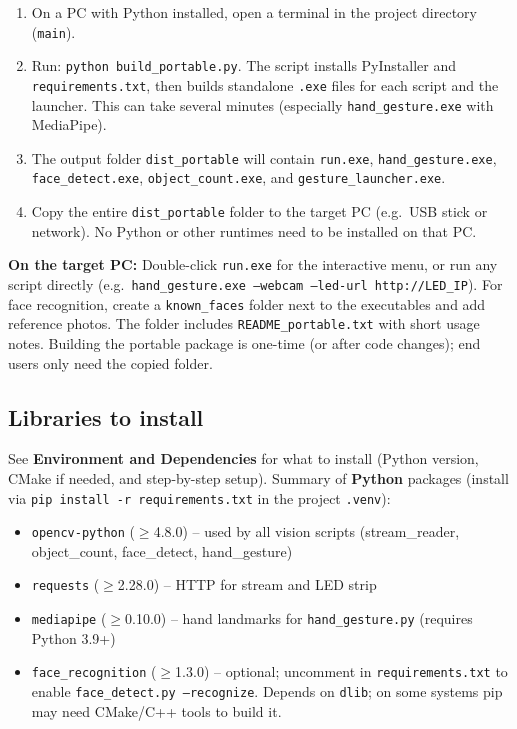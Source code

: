 \documentclass[a4paper,12pt]{article}
\begin{document}
\begin{enumerate}
    \item On a PC with Python installed, open a terminal in the project directory (\texttt{main}).
    \item Run: \texttt{python build\_portable.py}. The script installs PyInstaller and \texttt{requirements.txt}, then builds standalone \texttt{.exe} files for each script and the launcher. This can take several minutes (especially \texttt{hand\_gesture.exe} with MediaPipe).
    \item The output folder \texttt{dist\_portable} will contain \texttt{run.exe}, \texttt{hand\_gesture.exe}, \texttt{face\_detect.exe}, \texttt{object\_count.exe}, and \texttt{gesture\_launcher.exe}.
    \item Copy the entire \texttt{dist\_portable} folder to the target PC (e.g.\ USB stick or network). No Python or other runtimes need to be installed on that PC.
\end{enumerate}

\textbf{On the target PC:} Double-click \texttt{run.exe} for the interactive menu, or run any script directly (e.g.\ \texttt{hand\_gesture.exe --webcam --led-url http://LED\_IP}). For face recognition, create a \texttt{known\_faces} folder next to the executables and add reference photos. The folder includes \texttt{README\_portable.txt} with short usage notes. Building the portable package is one-time (or after code changes); end users only need the copied folder.

\subsection{Libraries to install}
See \textbf{Environment and Dependencies} for what to install (Python version, CMake if needed, and step-by-step setup). Summary of \textbf{Python} packages (install via \texttt{pip install -r requirements.txt} in the project \texttt{.venv}):
\begin{itemize}
    \item \texttt{opencv-python} ($\geq$4.8.0) -- used by all vision scripts (stream\_reader, object\_count, face\_detect, hand\_gesture)
    \item \texttt{requests} ($\geq$2.28.0) -- HTTP for stream and LED strip
    \item \texttt{mediapipe} ($\geq$0.10.0) -- hand landmarks for \texttt{hand\_gesture.py} (requires Python 3.9+)
    \item \texttt{face\_recognition} ($\geq$1.3.0) -- optional; uncomment in \texttt{requirements.txt} to enable \texttt{face\_detect.py --recognize}. Depends on \texttt{dlib}; on some systems pip may need CMake/C++ tools to build it.
\end{itemize}
\end{document}
